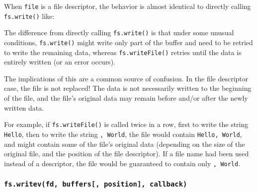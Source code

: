 When \texttt{file} is a file descriptor, the behavior is almost
identical to directly calling \texttt{fs.write()} like:

\begin{Shaded}
\begin{Highlighting}[]
 \OperatorTok{;}
\NormalTok{ \{ }\NormalTok{ \} } \OperatorTok{;}

\OperatorTok{,} \OperatorTok{,}\NormalTok{)}\OperatorTok{,}\OperatorTok{;}
\end{Highlighting}
\end{Shaded}

The difference from directly calling \texttt{fs.write()} is that under
some unusual conditions, \texttt{fs.write()} might write only part of
the buffer and need to be retried to write the remaining data, whereas
\texttt{fs.writeFile()} retries until the data is entirely written (or
an error occurs).

The implications of this are a common source of confusion. In the file
descriptor case, the file is not replaced! The data is not necessarily
written to the beginning of the file, and the file's original data may
remain before and/or after the newly written data.

For example, if \texttt{fs.writeFile()} is called twice in a row, first
to write the string \texttt{\textquotesingle{}Hello\textquotesingle{}},
then to write the string
\texttt{\textquotesingle{},\ World\textquotesingle{}}, the file would
contain \texttt{\textquotesingle{}Hello,\ World\textquotesingle{}}, and
might contain some of the file's original data (depending on the size of
the original file, and the position of the file descriptor). If a file
name had been used instead of a descriptor, the file would be guaranteed
to contain only \texttt{\textquotesingle{},\ World\textquotesingle{}}.

\subsubsection{\texorpdfstring{\texttt{fs.writev(fd,\ buffers{[},\ position{]},\ callback)}}{fs.writev(fd, buffers{[}, position{]}, callback)}}\label{fs.writevfd-buffers-position-callback}

